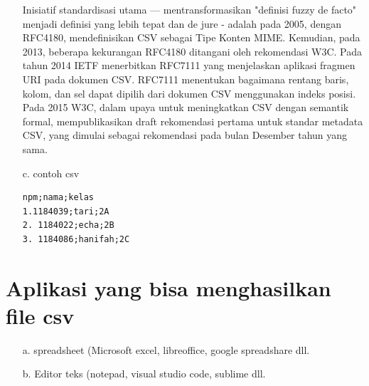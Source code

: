 \begin{enumerate}
Inisiatif standardisasi utama — mentransformasikan "definisi fuzzy de facto" menjadi definisi yang lebih tepat dan de jure - adalah pada 2005, dengan RFC4180, mendefinisikan CSV sebagai Tipe Konten MIME. Kemudian, pada 2013, beberapa kekurangan RFC4180 ditangani oleh rekomendasi W3C. Pada tahun 2014 IETF menerbitkan RFC7111 yang menjelaskan aplikasi fragmen URI pada dokumen CSV. RFC7111 menentukan bagaimana rentang baris, kolom, dan sel dapat dipilih dari dokumen CSV menggunakan indeks posisi. Pada 2015 W3C, dalam upaya untuk meningkatkan CSV dengan semantik formal, mempublikasikan draft rekomendasi pertama untuk standar metadata CSV, yang dimulai sebagai rekomendasi pada bulan Desember tahun yang sama. 
\item[c.] contoh csv
\begin{lstlisting}
npm;nama;kelas
1.1184039;tari;2A
2. 1184022;echa;2B
3. 1184086;hanifah;2C
\end{lstlisting}
\end{enumerate}
\section{Aplikasi yang bisa menghasilkan file csv}
\begin{enumerate}
    \item [a.]  spreadsheet  (Microsoft excel,  libreoffice, google spreadshare dll.
	\item[b.] Editor teks (notepad, visual studio code, sublime dll.
\end{enumerate}
